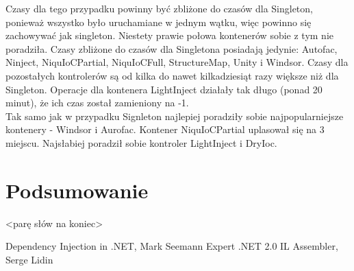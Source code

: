 \documentclass[12pt]{article}
\begin{document}
Czasy dla tego przypadku powinny być zbliżone do czasów dla Singleton, ponieważ wszystko było uruchamiane w jednym wątku, więc powinno się zachowywać jak singleton. Niestety prawie połowa kontenerów sobie z tym nie poradziła. Czasy zbliżone do czasów dla Singletona posiadają jedynie: Autofac, Ninject, NiquIoCPartial, NiquIoCFull, StructureMap, Unity i Windsor. Czasy dla pozostałych kontrolerów są od kilka do nawet kilkadziesiąt razy większe niż dla Singleton. Operacje dla kontenera LightInject działały tak długo (ponad 20 minut), że ich czas został zamieniony na -1.\\
Tak samo jak w przypadku Signleton najlepiej poradziły sobie najpopularniejsze kontenery - Windsor i Aurofac. Kontener NiquIoCPartial uplasował się na 3 miejscu. Najsłabiej poradził sobie kontroler LightInject i DryIoc.



\clearpage

\section{Podsumowanie}
<parę słów na koniec>

\newpage
\begin{thebibliography}{authordate1}
 Dependency Injection in .NET, Mark Seemann
 Expert .NET 2.0 IL Assembler, Serge Lidin
\end{thebibliography}
\end{document}
